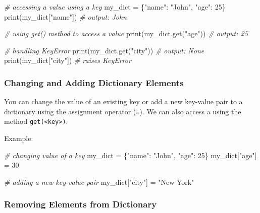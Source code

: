 \documentclass[11pt]{article}
\newenvironment{Shaded}{}{}
\newcommand{\DecValTok}[1]{\textcolor[rgb]{0.25,0.63,0.44}{{#1}}}
\newcommand{\StringTok}[1]{\textcolor[rgb]{0.25,0.44,0.63}{{#1}}}
\newcommand{\CommentTok}[1]{\textcolor[rgb]{0.38,0.63,0.69}{\textit{{#1}}}}
\newcommand{\NormalTok}[1]{{#1}}
\newcommand{\OperatorTok}[1]{\textcolor[rgb]{0.40,0.40,0.40}{{#1}}}
\newcommand{\BuiltInTok}[1]{{#1}}
\begin{document}
\begin{Shaded}
\begin{Highlighting}[]
\CommentTok{\# accessing a value using a key}
\NormalTok{my\_dict }\OperatorTok{=}\NormalTok{ \{}\StringTok{"name"}\NormalTok{: }\StringTok{"John"}\NormalTok{, }\StringTok{"age"}\NormalTok{: }\DecValTok{25}\NormalTok{\}}
\BuiltInTok{print}\NormalTok{(my\_dict[}\StringTok{"name"}\NormalTok{])  }\CommentTok{\# output: John}

\CommentTok{\# using get() method to access a value}
\BuiltInTok{print}\NormalTok{(my\_dict.get(}\StringTok{"age"}\NormalTok{))  }\CommentTok{\# output: 25}

\CommentTok{\# handling KeyError}
\BuiltInTok{print}\NormalTok{(my\_dict.get(}\StringTok{"city"}\NormalTok{))  }\CommentTok{\# output: None}
\BuiltInTok{print}\NormalTok{(my\_dict[}\StringTok{"city"}\NormalTok{])  }\CommentTok{\# raises KeyError}
\end{Highlighting}
\end{Shaded}

\hypertarget{changing-and-adding-dictionary-elements}{%
\subsubsection{Changing and Adding Dictionary
Elements}\label{changing-and-adding-dictionary-elements}}

You can change the value of an existing key or add a new key-value pair
to a dictionary using the assignment operator (\texttt{=}). We can also
access a using the method \texttt{get(\textless{}key\textgreater{})}.

Example:

\begin{Shaded}
\begin{Highlighting}[]
\CommentTok{\# changing value of a key}
\NormalTok{my\_dict }\OperatorTok{=}\NormalTok{ \{}\StringTok{"name"}\NormalTok{: }\StringTok{"John"}\NormalTok{, }\StringTok{"age"}\NormalTok{: }\DecValTok{25}\NormalTok{\}}
\NormalTok{my\_dict[}\StringTok{"age"}\NormalTok{] }\OperatorTok{=} \DecValTok{30}

\CommentTok{\# adding a new key{-}value pair}
\NormalTok{my\_dict[}\StringTok{"city"}\NormalTok{] }\OperatorTok{=} \StringTok{"New York"}
\end{Highlighting}
\end{Shaded}

\hypertarget{removing-elements-from-dictionary}{%
\subsubsection{Removing Elements from
Dictionary}\label{removing-elements-from-dictionary}}
\end{document}
